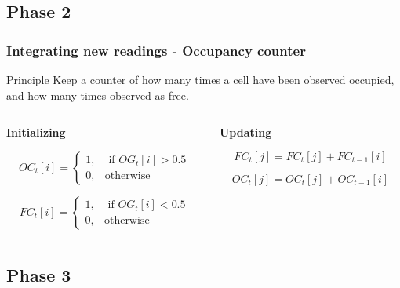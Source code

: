 \documentclass{beamer}
\begin{document}
\subsection{Phase 2}

	\begin{frame}
		\frametitle{Integrating new readings - Occupancy counter}		
		\begin{block}{Principle}
			Keep a counter of how many times a cell have been observed occupied, and how many times observed as free.
		\end{block}		
		
		  \begin{columns}[t]
		  \begin{column}{5cm}
		  \textbf{Initializing}
		  
		    \begin{equation}
			OC_t[i] =  \begin{cases} 1, & \mbox{ if $OG_t[i] > 0.5$} \\
			                       0, & \mbox{otherwise} \end{cases}
			\end{equation}

			\begin{equation}
			FC_t[i] = \begin{cases} 1, & \mbox{ if $OG_t[i] < 0.5$} \\
			                       0, & \mbox{otherwise} \end{cases}
			\end{equation}		  
		  
		  \end{column}
		  
		  \begin{column}{5cm}
		  \textbf{Updating}

			\begin{equation}
			FC_t[j] = FC_t[j] + FC_{t-1}[i]
			\end{equation}
			
			\begin{equation}
			OC_t[j] = OC_t[j] + OC_{t-1}[i]
			\end{equation}		  
		  
		  \end{column}
		 \end{columns}		 		
		
	\end{frame}

\subsection{Phase 3}
\end{document}

